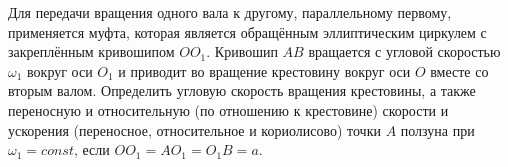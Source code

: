 Для передачи вращения одного вала к другому, параллельному первому,
применяется муфта, которая является обращённым эллиптическим циркулем
с закреплённым кривошипом $OO_1$.
Кривошип $AB$ вращается с угловой скоростью $\omega _1$ вокруг оси $O_1$
и приводит во вращение крестовину вокруг оси $O$ вместе со вторым валом.
Определить угловую скорость вращения крестовины,
а также переносную и относительную (по отношению к крестовине)
скорости и ускорения (переносное, относительное и кориолисово)
точки $A$ ползуна при $\omega _1 = const$,
если $OO_1 = AO_1 = O_1B = a$.
